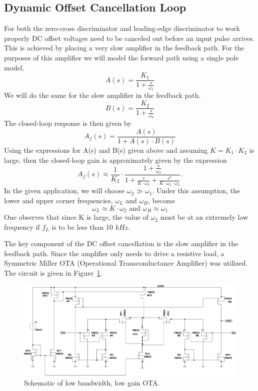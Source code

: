 \documentclass[12pt,oneside,final]{siuethesis}
\theoremstyle{definition}
\begin{document}
\subsection{Dynamic Offset Cancellation Loop}
\par For both the zero-cross discriminator and leading-edge discriminator to work properly DC offset voltages need to be canceled out before an input pulse arrives. This is achieved by placing a very slow amplifier in the feedback path.  For the purposes of this amplifier we will model the forward path using a single pole model.
\begin{equation}
A(s) = \frac{K_1}{1 + \frac{s}{\omega_1}}
\end{equation}
We will do the same for the slow amplifier in the feedback path.
\begin{equation}
B(s) = \frac{K_2}{1 + \frac{s}{\omega_2}}
\end{equation}
The closed-loop response is then given by 
\begin{equation}
A_f(s) = \frac{A(s)}{1 + A(s) \cdot B(s)} 
\end{equation}
Using the expressions for A(s) and B(s) given above and assuming $K = K_1 \cdot K_2$ is large, then the closed-loop gain is approximately given by the expression 
\begin{equation}
A_f(s) \approx \frac{1}{K_2} \cdot \frac{1 + \frac{s}{\omega_2}}{1 + \frac{s}{K \cdot \omega_2} + \frac{s^2}{K \cdot \omega_1 \cdot \omega_2}}.
\end{equation}
In the given application, we will choose $\omega_2 \gg \omega_1$.  Under this assumption, the lower and upper corner frequencies, $\omega_L$ and $\omega_H$, become
\begin{equation}
\omega_L \approx K \cdot \omega_2 \text{ and } \omega_H \approx  \omega_1
\end{equation}
One observes that since K is large, the value of $\omega_2$ must be at an extremely low frequency if $f_L$ is to be less than 10 $kHz$.
\par The key component of the DC offset cancellation is the slow amplifier in the feedback path. Since the amplifier only needs to drive a resistive load, a Symmetric Miller OTA (Operational Transconductance Amplifier) was utilized.  The circuit is given in Figure~\ref{fig:slowota}.

\begin{figure}[htbp!]
	\centering
 	\includegraphics[scale=0.8,keepaspectratio=true, angle=90]{../Design_Reports/CFD_circuit_report/images/small_gm_ota.pdf}
 	\caption{Schematic of low bandwidth, low gain OTA.}
 	\label{fig:slowota}
\end{figure}
\end{document}
